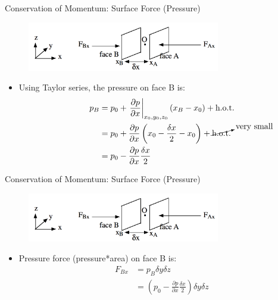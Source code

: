 \begin{frame}{Conservation of Momentum: Surface Force (Pressure)}
\begin{figure}
		\includegraphics[width=0.75\textwidth]{pressure2.png}	
	\end{figure}
\begin{itemize}
	\item Using Taylor series, the pressure on face B is:
	\begin{align*}
	p_B &= p_0 + \left.\frac{\partial p}{\partial x}\right|_{x_0,y_0,z_0}(x_B - x_0) + \text{h.o.t.}\\
	&= p_0 + \frac{\partial p}{\partial x} \left(x_0 - \frac{\delta x}{2} - x_0 \right)+ \cancelto{\text{very small}}{\text{h.o.t.}}\\
	&= p_0 - \frac{\partial p}{\partial x}\frac{\delta x}{2}
	\end{align*}
\end{itemize}
\end{frame}
\begin{frame}{Conservation of Momentum: Surface Force (Pressure)}
\begin{figure}
		\includegraphics[width=0.75\textwidth]{pressure2.png}	
	\end{figure}
\begin{itemize}
	\item Pressure force (pressure*area) on face B is:
	\begin{align*}
	 	F_{Bx} &= p_B \delta y \delta z\\
	 	&= \left(p_0 - \frac{\partial p}{\partial x}\frac{\delta x}{2}\right)\delta y \delta z
	\end{align*}
\end{itemize}
\end{frame}
